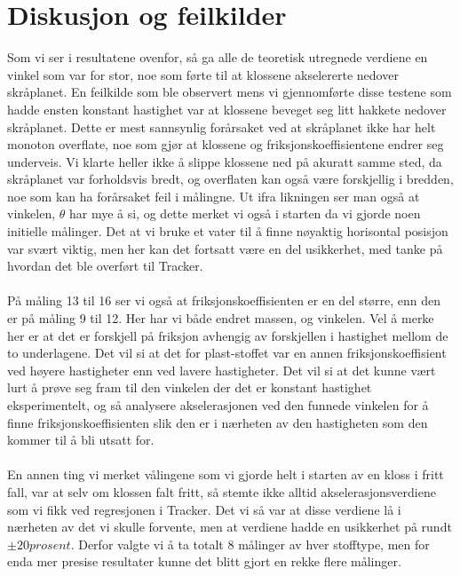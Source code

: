 \documentclass[10pt,a4paper]{report}
\begin{document}
\section*{Diskusjon og feilkilder}
Som vi ser i resultatene ovenfor, så ga alle de teoretisk utregnede verdiene en vinkel som var for stor, noe som førte til at klossene akselererte nedover skråplanet. En feilkilde som ble observert mens vi gjennomførte disse testene som hadde ensten konstant hastighet var at klossene beveget seg litt hakkete nedover skråplanet. Dette er mest sannsynlig forårsaket ved at skråplanet ikke har helt monoton overflate, noe som gjør at klossene og friksjonskoeffisientene endrer seg underveis. Vi klarte heller ikke å slippe klossene ned på akuratt samme sted, da skråplanet var forholdsvis bredt, og overflaten kan også være forskjellig i bredden, noe som kan ha forårsaket feil i målingne. Ut ifra likningen ser man også at vinkelen, $\theta$ har mye å si, og dette merket vi også i starten da vi gjorde noen initielle målinger. Det at vi bruke et vater til å finne nøyaktig horisontal posisjon var svært viktig, men her kan det fortsatt være en del usikkerhet, med tanke på hvordan det ble overført til Tracker. \\
\\På måling 13 til 16 ser vi også at friksjonskoeffisienten er en del større, enn den er på måling 9 til 12. Her har vi både endret massen, og vinkelen. Vel å merke her er at det er forskjell på friksjon avhengig av forskjellen i hastighet mellom de to underlagene. Det vil si at det for plast-stoffet var en annen friksjonskoeffisient ved høyere hastigheter enn ved lavere hastigheter. Det vil si at det kunne vært lurt å prøve seg fram til den vinkelen der det er konstant hastighet eksperimentelt, og så analysere akselerasjonen ved den funnede vinkelen for å finne friksjonskoeffisienten slik den er i nærheten av den hastigheten som den kommer til å bli utsatt for.\\
\\En annen ting vi merket vålingene som vi gjorde helt i starten av en kloss i fritt fall, var at selv om klossen falt fritt, så stemte ikke alltid akselerasjonsverdiene som vi fikk ved regresjonen i Tracker. Det vi så var at disse verdiene lå i nærheten av det vi skulle forvente, men at verdiene hadde en usikkerhet på rundt $\pm 20 prosent$. Derfor valgte vi å ta totalt 8 målinger av hver stofftype, men for enda mer presise resultater kunne det blitt gjort en rekke flere målinger.
\end{document}
